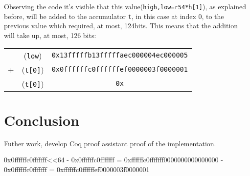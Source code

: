 \documentclass{article}
\begin{document}
Observing the code it's visible that this value(\texttt{high,low=r54*h[1]}), as explained before, will be added to the accumulator \texttt{t}, in this case
at index 0, to the previous value which required, at most, 124bits. This means that the addition will take up, at most, 126 bits:
\begin{tabular}{c c c}
    &  (\texttt{low})        &\texttt{0x13fffffb13fffffaec000004ec000005} \\
+   &  (\texttt{t[0]})       &\texttt{0x0ffffffc0ffffffef0000003f0000001} \\
\hline
    & (\texttt{t[0]})        &\texttt{0x} \\
\end{tabular}


\section{Conclusion}
Futher work, develop Coq proof assistant proof of the implementation.

\printbibliography

\newpage

\begin{appendices}
0x0ffffffc0fffffff<<64 - 0x0ffffffc0fffffff = 0xffffffc0fffffff0000000000000000 - 0x0ffffffc0fffffff = 0xffffffc0ffffffef0000003f0000001
\end{appendices}
\end{document}
